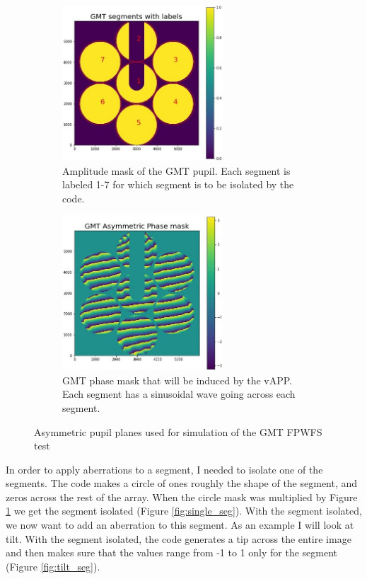 \begin{figure}[H]
\centering
\begin{subfigure}{.5\textwidth}
  \centering
  \includegraphics[width=6cm]{Figures/GMT_seg_choice.jpg}
  \caption{Amplitude mask of the GMT pupil.  Each segment is labeled 1-7 for which segment is to be isolated by the code.}
  \label{fig:amp_mask}
\end{subfigure}%
\begin{subfigure}{.5\textwidth}
  \centering
  \includegraphics[width=6cm]{Figures/gmt_phase_mask.jpg}
  \caption{GMT phase mask that will be induced by the vAPP.  Each segment has a sinusoidal wave going across each segment.}
  \label{fig:phase_mask}
\end{subfigure}
\caption{Asymmetric pupil planes used for simulation of the GMT FPWFS test}
\label{fig:asym_pupils}
\end{figure}


In order to apply aberrations to a segment, I needed to isolate one of the segments.  The code makes a circle of
ones roughly the shape of the segment, and zeros across the rest of the array. When the circle mask was multiplied
by Figure \ref{fig:amp_mask} we get the segment isolated (Figure \ref{fig:single_seg}).  With the segment isolated,
we now want to add an aberration to this segment.  As an example I will look at tilt.  With the segment isolated,
the code generates a tip across the entire image and then makes sure that the values range from -1 to 1 only for the
segment (Figure \ref{fig:tilt_seg}).  

